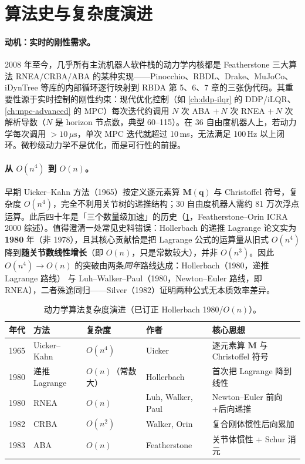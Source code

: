 \section{算法史与复杂度演进}
\label{sec:on-history}

\paragraph{动机：实时的刚性需求。}
2008 年至今，几乎所有主流机器人软件栈的动力学内核都是 Featherstone 三大算法 RNEA/CRBA/ABA 的某种实现——Pinocchio\cite{carpentier2019pinocchio}、RBDL、Drake、MuJoCo、iDynTree 等库的内部循环逐行映射到 RBDA\cite{featherstone2008rigid} 第 5、6、7 章的三张伪代码。其重要性源于实时控制的刚性约束：现代优化控制（如 \cref{ch:ddp-ilqr} 的 DDP/iLQR、\cref{ch:mpc-advanced} 的 MPC）每次迭代约调用 $N$ 次 ABA $+\,N$ 次 RNEA $+\,N$ 次解析导数（$N$ 是 horizon 节点数，典型 60--115）。在 36 自由度机器人上，若动力学每次调用 $>10\,\mu\mathrm s$，单次 MPC 迭代就超过 10\,ms，无法满足 100\,Hz 以上闭环。微秒级动力学不是优化，而是可行性的前提。

\paragraph{从 $O(n^4)$ 到 $O(n)$。}
早期 Uicker--Kahn 方法（1965）按定义逐元素算 $\mathbf M(\mathbf q)$ 与 Christoffel 符号，复杂度 $O(n^4)$，完全不利用关节树的递推结构；30 自由度机器人需约 81 万次浮点运算。此后四十年是「三个数量级加速」的历史（\cref{tab:on-history}，Featherstone--Orin ICRA 2000 综述\cite{featherstone2000robot}）。值得澄清一处常见史料错误：Hollerbach 的递推 Lagrange 论文实为 \textbf{1980} 年（非 1978），且其核心贡献恰是把 Lagrange 公式的运算量从旧式 $O(n^4)$ 降到\textbf{随关节数线性增长}（即 $O(n)$，只是常数较大），并非 $O(n^3)$。因此 $O(n^4)\to O(n)$ 的突破由两条\emph{同年}路线达成：Hollerbach（1980，递推 Lagrange 路线）\cite{hollerbach1980recursive} 与 Luh--Walker--Paul（1980，Newton--Euler 路线，即 RNEA）\cite{luh1980online}，二者殊途同归——Silver（1982）证明两种公式无本质效率差异\cite{silver1982equivalence}。

\begin{table}[H]\centering\small
\caption{动力学算法复杂度演进（已订正 Hollerbach 1980/$O(n)$）。}
\label{tab:on-history}
\begin{tabular}{lllll}
\toprule
年代 & 方法 & 复杂度 & 作者 & 核心思想 \\
\midrule
1965 & Uicker--Kahn & $O(n^4)$ & Uicker & 逐元素算 $\mathbf M$ 与 Christoffel 符号 \\
1980 & 递推 Lagrange & $O(n)$（常数大） & Hollerbach & 首次把 Lagrange 降到线性 \\
1980 & RNEA & $O(n)$ & Luh, Walker, Paul & Newton--Euler 前向+后向递推 \\
1982 & CRBA & $O(n^2)$ & Walker, Orin & 复合刚体惯性后向累加 \\
1983 & ABA & $O(n)$ & Featherstone & 关节体惯性 + Schur 消元 \\
\bottomrule
\end{tabular}
\end{table}


